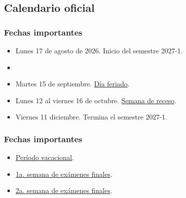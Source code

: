 \documentclass[12pt]{beamer}
\begin{document}
\subsection{Calendario oficial}

\begin{frame}
\frametitle{Fechas importantes}
\begin{itemize}[<+->]
\item Lunes 17 de agosto de 2026. Inicio del semestre 2027-1.
\item {}
\item Martes 15 de septiembre. \underline{Día feriado}.
\item Lunes 12 al viernes 16 de octubre. \underline{Semana de receso}.
\item Viernes 11 diciembre. Termina el semestre 2027-1.
\end{itemize}
\end{frame}
\begin{frame}
\frametitle{Fechas importantes}
\begin{itemize}[<+->]
\item {} \underline{Período vacacional}.
\item {} \underline{1a. semana de exámenes finales}.
\item {} \underline{2a. semana de exámenes finales}.
\end{itemize}
\end{frame}
\end{document}
